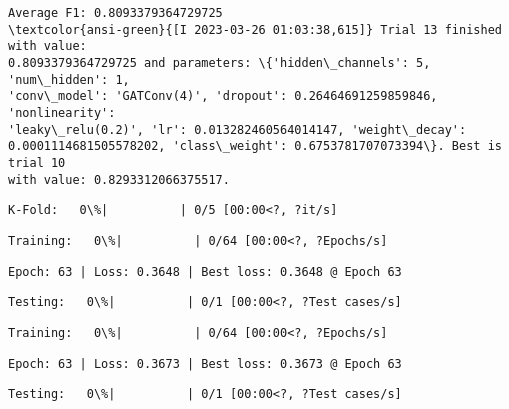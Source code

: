 \documentclass[11pt]{article}
\begin{document}
    
    \begin{Verbatim}[commandchars=\\\{\}]
Average F1: 0.8093379364729725
\textcolor{ansi-green}{[I 2023-03-26 01:03:38,615]} Trial 13 finished with value:
0.8093379364729725 and parameters: \{'hidden\_channels': 5, 'num\_hidden': 1,
'conv\_model': 'GATConv(4)', 'dropout': 0.26464691259859846, 'nonlinearity':
'leaky\_relu(0.2)', 'lr': 0.013282460564014147, 'weight\_decay':
0.0001114681505578202, 'class\_weight': 0.6753781707073394\}. Best is trial 10
with value: 0.8293312066375517.
    \end{Verbatim}

    
    \begin{Verbatim}[commandchars=\\\{\}]
K-Fold:   0\%|          | 0/5 [00:00<?, ?it/s]
    \end{Verbatim}

    
    
    \begin{Verbatim}[commandchars=\\\{\}]
Training:   0\%|          | 0/64 [00:00<?, ?Epochs/s]
    \end{Verbatim}

    
    \begin{Verbatim}[commandchars=\\\{\}]
Epoch: 63 | Loss: 0.3648 | Best loss: 0.3648 @ Epoch 63
    \end{Verbatim}

    
    \begin{Verbatim}[commandchars=\\\{\}]
Testing:   0\%|          | 0/1 [00:00<?, ?Test cases/s]
    \end{Verbatim}

    
    
    \begin{Verbatim}[commandchars=\\\{\}]
Training:   0\%|          | 0/64 [00:00<?, ?Epochs/s]
    \end{Verbatim}

    
    \begin{Verbatim}[commandchars=\\\{\}]
Epoch: 63 | Loss: 0.3673 | Best loss: 0.3673 @ Epoch 63
    \end{Verbatim}

    
    \begin{Verbatim}[commandchars=\\\{\}]
Testing:   0\%|          | 0/1 [00:00<?, ?Test cases/s]
    \end{Verbatim}
\end{document}
